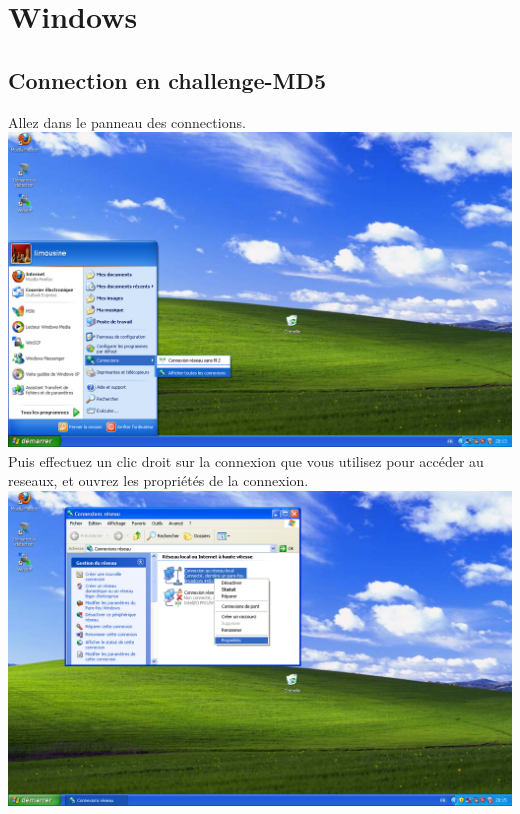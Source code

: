 \newcommand{\screenShotSize}{400pt}


\section{Windows}


\subsection{Connection en challenge-MD5}

Allez dans le panneau des connections.\\
\includegraphics[width=\screenShotSize{}]{imgUser/connections.PNG}\\
Puis effectuez un clic droit sur la connexion que vous utilisez pour accéder au reseaux, et ouvrez les propriétés de la connexion.\\
\includegraphics[width=\screenShotSize{}]{imgUser/connectionProperties.PNG}\\
